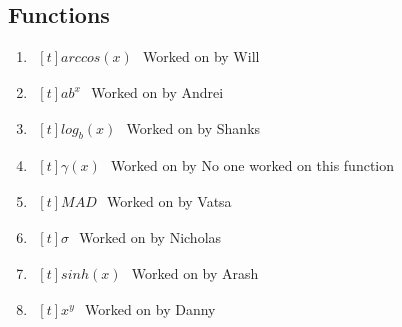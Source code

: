 \documentclass[titlepage]{article}
\begin{document}
    \subsection{Functions}
        \begin{enumerate}
            \item $\begin{aligned}[t]
                arccos(x)
            \end{aligned}$
                Worked on by Will

            \item $\begin{aligned}[t]
                ab^x
            \end{aligned}$
                Worked on by Andrei

            \item $\begin{aligned}[t]
                log_{b}(x)
            \end{aligned}$
                Worked on by Shanks

            \item $\begin{aligned}[t]
                \gamma(x)
            \end{aligned}$
                Worked on by No one worked on this function

            \item $\begin{aligned}[t]
                MAD
            \end{aligned}$
                Worked on by Vatsa

            \item $\begin{aligned}[t]
                \sigma
            \end{aligned}$
                Worked on by Nicholas

            \item $\begin{aligned}[t]
                sinh(x)
            \end{aligned}$
                Worked on by Arash

            \item $\begin{aligned}[t]
                x^y
            \end{aligned}$
                Worked on by Danny
        \end{enumerate}
\end{document}
